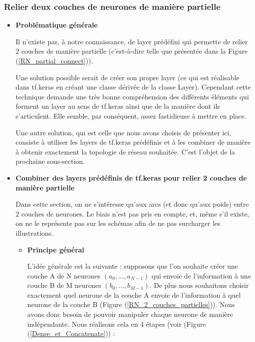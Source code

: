 \subsubsection{Relier deux couches de neurones de manière partielle}
\begin{itemize}[label=$\square$]
\item \textbf{Problématique générale}

Il n'existe pas, à notre connaissance, de layer prédéfini qui permette de relier 2 couches de manière partielle (c'est-à-dire telle que présentée dans la Figure (\ref{RN_partial_connect})). 

Une solution possible serait de créer son propre layer (ce qui est réalisable dans tf.keras en créant une classe dérivée de la classe Layer). Cependant cette technique demande une très bonne compréhension des différents éléments qui forment un layer au sens de tf.keras ainsi que de la manière dont ils s'articulent. Elle semble, par conséquent, assez fastidieuse à mettre en place.

Une autre solution, qui est celle que nous avons choisis de présenter ici, consiste à utiliser les layers de tf.keras prédéfinis et à les combiner de manière à obtenir exactement la topologie de réseau souhaitée. C'est l'objet de la prochaine sous-section. 

\item \textbf{Combiner des layers prédéfinis de tf.keras pour relier 2 couches de manière partielle}
\begin{Rem}
	Dans cette section, on ne s'intéresse qu'aux arcs (et donc qu'aux poids) entre 2 couches de neurones. Le biais n'est pas pris en compte, et, même s'il existe, on ne le représente pas sur les schémas afin de ne pas surcharger les illustrations. 
\end{Rem}
\begin{itemize}
\item	\textbf{Principe général}

L'idée générale est la suivante : supposons que l'on souhaite créer une couche A de N neurones $(a_0, \dots ,a_{N-1})$ qui envoie de l'information à une couche B de M neurones $(b_0, \dots ,b_{M-1})$. De plus nous souhaitons choisir exactement quel neurone de la couche A envoie de l'information à quel neurone de la couche B (Figure (\ref{RN_2_couches_partielles})). Nous avons donc besoin de pouvoir manipuler chaque neurone de manière indépendante. Nous réalisons cela en 4 étapes (voir (Figure (\ref{Dense_et_Concatenate})) :


\end{itemize}
\end{itemize}
